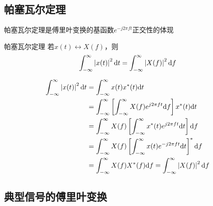 \subsection{帕塞瓦尔定理}
    帕塞瓦尔定理是傅里叶变换的基函数$e^{-j2\pi ft}$正交性的体现
    \begin{mythm}{帕塞瓦尔定理}\label{thm:parseval}
        若$x(t)\leftrightarrow X(f)$，则
        \begin{equation}
            \int_{-\infty}^{\infty}\left\vert x(t) \right\vert^2\text{\upshape d} t = \int_{-\infty}^{\infty}\left\vert X(f) \right\vert^2\text{\upshape d} f
        \end{equation}
    \end{mythm}
    \Proof
    \begin{equation*}
        \begin{split}
            \int_{-\infty}^{\infty}\left\vert x(t) \right\vert^2\text{\upshape d} t &= \int_{-\infty}^{\infty}x(t)x^*(t)\text{\upshape d} t\\
                                                      &= \int_{-\infty}^{\infty}\left[\int_{-\infty}^{\infty}X(f)e^{j2\pi ft}\text{\upshape d} f\right]x^*(t)\text{\upshape d} t\\
                                                      &= \int_{-\infty}^{\infty}X(f)\left[\int_{-\infty}^{\infty}x^*(t)e^{j2\pi ft}\text{\upshape d} t\right]\text{\upshape d} f\\
                                                      &= \int_{-\infty}^{\infty}X(f)\left[\int_{-\infty}^{\infty}x(t)e^{-j2\pi ft}\text{\upshape d} t\right]^*\text{\upshape d} f\\
                                                      &= \int_{-\infty}^{\infty}X(f)X^*(f) \text{\upshape d} f= \int_{-\infty}^{\infty}\left\vert X(f) \right\vert^2\text{\upshape d} f
        \end{split}
    \end{equation*}

\subsection{典型信号的傅里叶变换}
